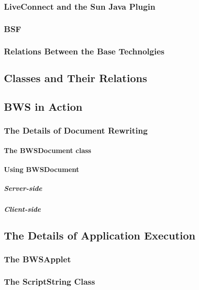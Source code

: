    
    
  \subsubsection{LiveConnect and the Sun Java Plugin}
  
   
   
  \subsubsection{BSF}
  
   
  
  \subsubsection{Relations Between the Base Technolgies}
   
   
   
 \subsection{Classes and Their Relations}
 \subsection{BWS in Action}
  \subsubsection{The Details of Document Rewriting}
   \paragraph{The BWSDocument class}
   \paragraph{Using BWSDocument}
    \subparagraph{Server-side}
    \subparagraph{Client-side}
  \subsection{The Details of Application Execution}
   \subsubsection{The BWSApplet}
   \subsubsection{The ScriptString Class}
